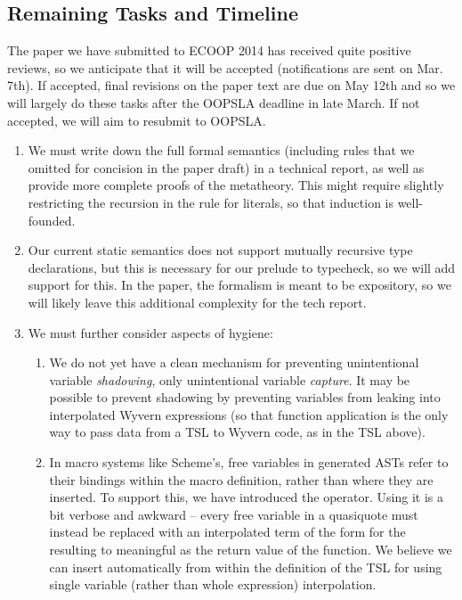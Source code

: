 {\subsection{Remaining Tasks and Timeline}
The paper we have submitted to ECOOP 2014 has received quite positive reviews, so we anticipate that it will be accepted (notifications are sent on Mar. 7th). If accepted, final revisions on the paper text are due on May 12th and so we will largely do these tasks after the OOPSLA deadline in late March. If not accepted, we will aim to resubmit to OOPSLA.
\begin{enumerate}
\item We must write down the full formal semantics (including rules that we omitted for concision in the paper draft) in a technical report, as well as provide more complete proofs of the metatheory. This might require slightly restricting the recursion in the rule for literals, so that induction is well-founded.
\item Our current static semantics does not support mutually recursive type declarations, but this is necessary for our prelude to typecheck, so we will add support for this. In the paper, the formalism is meant to be expository, so we will likely leave this additional complexity for the tech report.
\item We must further consider aspects of hygiene:
\begin{enumerate}
\item We do not yet have a clean mechanism for preventing unintentional variable \emph{shadowing}, only unintentional variable \emph{capture}. It may be possible to prevent shadowing by preventing variables from leaking into interpolated Wyvern expressions (so that function application is the only way to pass data from a TSL to Wyvern code, as in the  TSL above).
\item In macro systems like Scheme's, free variables in generated ASTs refer to their bindings within the macro definition, rather than where they are inserted. To support this, we have introduced the  operator. Using it is a bit verbose and awkward -- every free variable  in a quasiquote must instead be replaced with an interpolated term of the form  for the resulting  to meaningful as the return value of the  function. We believe we can insert  automatically from within the definition of the TSL for  using single variable (rather than whole expression) interpolation.

\end{enumerate}
\end{enumerate}}
